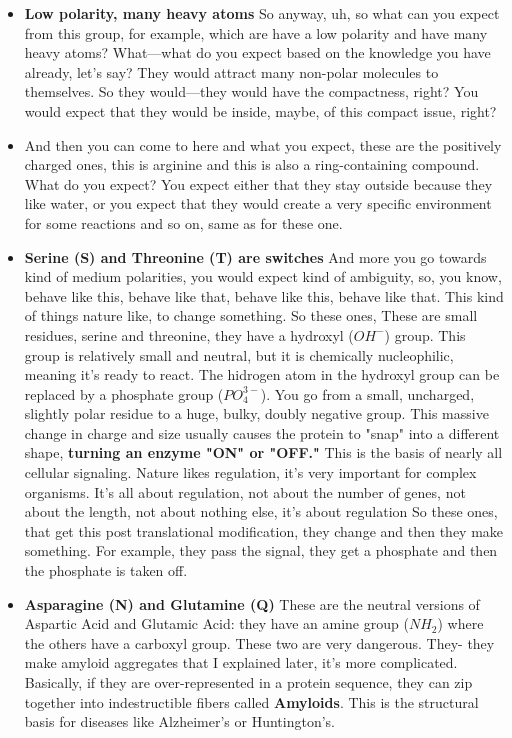 \begin{itemize}
    \item \textbf{Low polarity, many heavy atoms} So anyway, uh, so what can you expect from this group, for example, which are have a low polarity and have many heavy atoms? What—what do you expect based on the knowledge you have already, let’s say? They would attract many non-polar molecules to themselves. So they would—they would have the compactness, right? You would expect that they would be inside, maybe, of this compact issue, right? 
    
    \item  And then you can come to here and what you expect, these are the positively charged ones, this is arginine and this is also a ring-containing compound. What do you expect? You expect either that they stay outside because they like water, or you expect that they would create a very specific environment for some reactions and so on, same as for these one. 
    
    \item \textbf{Serine (S) and Threonine (T) are switches} And more you go towards kind of medium polarities, you would expect kind of ambiguity, so, you know, behave like this, behave like that, behave like this, behave like that. This kind of things nature like, to change something. So these ones, These are small residues, serine and threonine, they
    have a hydroxyl ($OH^{-}$) group. This group is relatively small and neutral, but it is chemically nucleophilic, meaning it’s ready to react. The hidrogen atom in the hydroxyl group can be replaced by a phosphate group ($PO_4^{3 -}$). You go from a small, uncharged, slightly polar residue to a huge, bulky, doubly negative group. This massive change in charge and size usually causes the protein to "snap" into a different shape, \textbf{turning an enzyme "ON" or "OFF."} This is the basis of nearly all cellular signaling.
     Nature likes regulation, it's very important for complex organisms. It's all about regulation, not about the number of genes, not about the length, not about nothing else, it's about regulation So these ones, that get this post translational modification, they change and then they make something. For example, they pass the signal, they get a phosphate and then the phosphate is taken off.
    
    \item \textbf{Asparagine (N) and Glutamine (Q)}
    These are the neutral versions of Aspartic Acid and Glutamic Acid: they have an amine group ($NH_2$) where the others have a carboxyl group.
These two are very dangerous. They- they make amyloid aggregates that I explained later, it's more complicated. Basically, if they are over-represented in a protein sequence, they can zip together into indestructible fibers called \textbf{Amyloids}. This is the structural basis for diseases like Alzheimer’s or Huntington’s.


\end{itemize}

